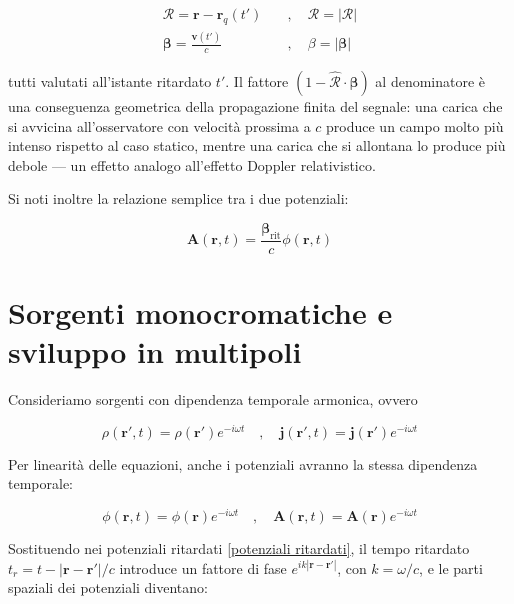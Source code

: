 \begin{align}
    \boldsymbol{\mathcal{R}} = \mathbf{r} - \mathbf{r}_q(t') \quad &, \quad \mathcal{R} = |\boldsymbol{\mathcal{R}}| \\
    \boldsymbol{\beta} = \frac{\mathbf{v}(t')}{c} \quad &, \quad \beta = |\boldsymbol{\beta}|
\end{align}

tutti valutati all'istante ritardato $t'$. Il fattore $(1 - \hat{\mathcal{R}} \cdot \boldsymbol{\beta})$ al denominatore è una conseguenza geometrica della propagazione finita del segnale: una carica che si avvicina all'osservatore con velocità prossima a $c$ produce un campo molto più intenso rispetto al caso statico, mentre una carica che si allontana lo produce più debole — un effetto analogo all'effetto Doppler relativistico.

Si noti inoltre la relazione semplice tra i due potenziali:

\begin{tcolorbox}[colback=yellow!10!white, colframe=orange!70!black, 
boxrule=0.8pt]
\begin{equation}
    \mathbf{A}(\mathbf{r}, t) = \frac{\boldsymbol{\beta}_{\text{rit}}}{c} 
    \phi(\mathbf{r}, t)
\end{equation}
\end{tcolorbox}

\section{Sorgenti monocromatiche e sviluppo in multipoli}

Consideriamo sorgenti con dipendenza temporale armonica, ovvero 

\begin{equation}
    \rho(\mathbf{r'}, t) = \rho(\mathbf{r'}) e^{-i\omega t} \quad , \quad 
    \mathbf{j}(\mathbf{r'}, t) = \mathbf{j}(\mathbf{r'}) e^{-i\omega t}
\end{equation}

Per linearità delle equazioni, anche i potenziali avranno la stessa dipendenza temporale:

\begin{equation}
    \phi(\mathbf{r}, t) = \phi(\mathbf{r}) e^{-i\omega t} \quad , \quad 
    \mathbf{A}(\mathbf{r}, t) = \mathbf{A}(\mathbf{r}) e^{-i\omega t}
\end{equation}

Sostituendo nei potenziali ritardati \ref{potenziali ritardati}, il tempo ritardato $t_r = t - |\mathbf{r} - \mathbf{r'}|/c$ introduce un fattore di fase $e^{ik|\mathbf{r}-\mathbf{r'}|}$, con $k = \omega/c$, e le parti spaziali dei potenziali diventano:


